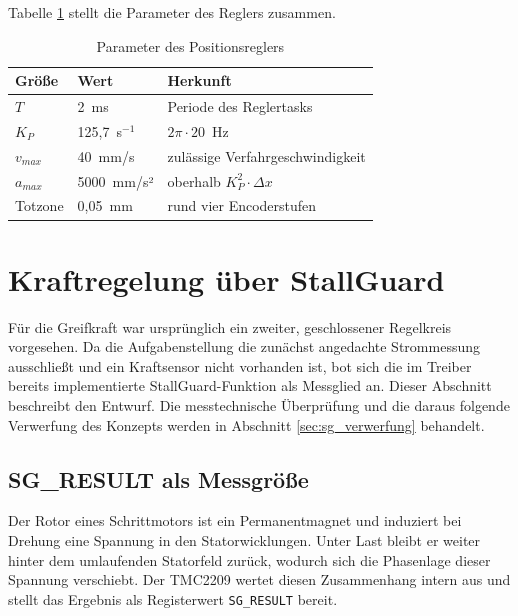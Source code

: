 Tabelle \ref{tab:reglerparameter} stellt die Parameter des Reglers zusammen.

\begin{table}[htbp]
    \centering
    \caption{Parameter des Positionsreglers}
    \label{tab:reglerparameter}
    \begin{tabular}{llp{6cm}}
        \hline
        Größe & Wert & Herkunft \\
        \hline
        $T$        & 2~ms                    & Periode des Reglertasks \\
        $K_P$      & 125,7~s$^{-1}$          & $2\pi \cdot 20$~Hz \\
        $v_{max}$  & 40~mm/s                 & zulässige Verfahrgeschwindigkeit \\
        $a_{max}$  & 5000~mm/s²              & oberhalb $K_P^2 \cdot \Delta x$ \\
        Totzone    & 0,05~mm                 & rund vier Encoderstufen \\
        \hline
    \end{tabular}
\end{table}

\section{Kraftregelung über StallGuard}
\label{sec:sg_entwurf}

Für die Greifkraft war ursprünglich ein zweiter, geschlossener Regelkreis vorgesehen. Da
die Aufgabenstellung die zunächst angedachte Strommessung ausschließt und ein Kraftsensor
nicht vorhanden ist, bot sich die im Treiber bereits implementierte StallGuard-Funktion
als Messglied an. Dieser Abschnitt beschreibt den Entwurf. Die messtechnische
Überprüfung und die daraus folgende Verwerfung des Konzepts werden in Abschnitt
\ref{sec:sg_verwerfung} behandelt.

\subsection*{SG\_RESULT als Messgröße}

Der Rotor eines Schrittmotors ist ein Permanentmagnet und induziert bei Drehung eine
Spannung in den Statorwicklungen. Unter Last bleibt er weiter hinter dem umlaufenden
Statorfeld zurück, wodurch sich die Phasenlage dieser Spannung verschiebt. Der TMC2209
wertet diesen Zusammenhang intern aus und stellt das Ergebnis als Registerwert
\texttt{SG\_RESULT} bereit.

